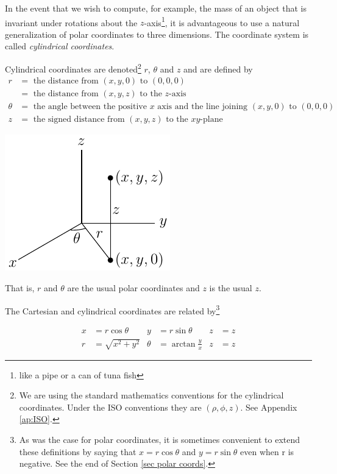 In the event that we wish to compute, for example, the mass
of an object that is invariant under rotations about the 
$z$-axis\footnote{like a pipe or a can of tuna fish},
it is advantageous to use a natural generalization of polar coordinates
to three dimensions. The coordinate system is called \emph{cylindrical
coordinates}. 
\begin{defn}\label{def cylindrical}
Cylindrical coordinates are denoted\footnote{We are using the 
standard mathematics conventions for the cylindrical coordinates.
Under the ISO conventions they are $(\rho,\phi,z)$.
See Appendix \ref{ap:ISO}.} 
$r$, $\theta$ and $z$ and are defined by
\begin{align*}
r&=\text{ the distance from }(x,y,0)\text{ to }(0,0,0)\\
 &=\text{ the distance from }(x,y,z)\text{ to the $z$-axis}\\
\theta&=\text{ the angle between the positive $x$ axis and the 
            line joining $(x,y,0)$ to $(0,0,0)$}\\
z&=\text{ the signed distance from }(x,y,z)
\text{ to the $xy$-plane}
\end{align*}
\begin{efig}
\begin{center}
    \includegraphics{figures/coord/cyl1.pdf}
\end{center}
\end{efig}
That is, $r$ and $\theta$ are the usual polar coordinates and $z$ is the
usual $z$.
\end{defn}
 The Cartesian and cylindrical coordinates
are related by\footnote{As was the case for polar coordinates, it is 
sometimes convenient to extend these definitions by saying that 
$x = r\cos\theta$ and $y = r\sin\theta$ even when r is negative. See the end of Section \ref{sec polar coords}.}
\begin{impeqn}\label{eqn cylindrical}
\begin{align*}
x&=r\cos\theta &
y&=r\sin\theta &
z&=z \\
    r&=\sqrt{x^2+y^2} &
    \theta&=\arctan\frac{y}{x} &
    z&=z
\end{align*}
\end{impeqn}

